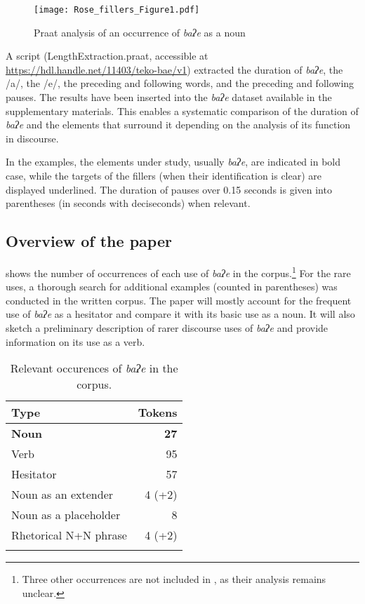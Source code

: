 \documentclass[output=paper]{langscibook}
\begin{document}
\begin{figure}
\texttt{[image: Rose\_fillers\_Figure1.pdf]}
\caption{\label{fig:rose:1}Praat analysis of an occurrence of \textit{baʔe} as a noun}
\end{figure} 

A script (LengthExtraction.praat, accessible at \url{https://hdl.handle.net/11403/teko-bae/v1}) extracted the duration of \textit{baʔe}, the /a/, the /e/, the preceding and following words, and the preceding and following pauses. The results have been inserted into the \textit{baʔe} dataset available in the supplementary materials. This enables a systematic comparison of the duration of \textit{baʔe} and the elements that surround it depending on the analysis of its function in discourse.

In the examples, the elements under study, usually \textit{baʔe}, are indicated in bold case, while the targets of the fillers (when their identification is clear) are displayed underlined. The duration of pauses over 0.15 seconds is given into parentheses (in seconds with deciseconds) when relevant.

\subsection{Overview of the paper}
\label{sec:rose:1.5}

 shows the number of occurrences of each use of \textit{baʔe} in the corpus.\footnote{Three other occurrences are not included in , as their analysis remains unclear.} For the rare uses, a thorough search for additional examples (counted in parentheses) was conducted in the written corpus. The paper will mostly account for the frequent use of \textit{baʔe} as a hesitator and compare it with its basic use as a noun. It will also sketch a preliminary description of rarer discourse uses of \textit{baʔe} and provide information on its use as a verb.

\begin{table}
\begin{tabular}{lr}
\lsptoprule
{\bfseries {Type}} & {Tokens}\\
\midrule
{\bfseries \textmd{Noun}} & {\bfseries \textmd{27}}\\
Verb & 95\\
Hesitator & 57\\
Noun as an extender & 4 (+2)\\
Noun as a placeholder & 8\\
Rhetorical N+N phrase & 4 (+2)\\
\lspbottomrule
\end{tabular}
\caption{\label{tab:rose:1}Relevant occurences of \textit{baʔe} in the corpus.}
\end{table}
\end{document}
